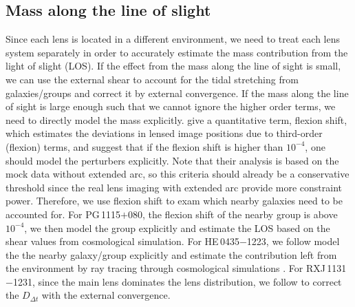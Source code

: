 \documentclass[useAMS,usenatbib]{mnras}
\newcommand\rxj{RXJ\,1131$-$1231}
\newcommand\he{HE\,0435$-$1223}
\newcommand\pg{PG\,1115$+$080}
\newcommand{\Ddt}{{D_{\Delta t}}}
\begin{document}
\subsection{Mass along the line of slight}
\label{sec:LOS}
Since each lens is located in a different environment, we need to treat each lens system separately in order to accurately estimate the mass contribution from the light of slight (LOS). 
If the effect from the mass along the line of sight is small, we can use the external shear to account for the tidal stretching from galaxies/groups and correct it by external convergence. 
If the mass along the line of sight is large enough such that we cannot ignore the higher order terms, we need to directly model the mass explicitly.
\citet{McCullyEtal14,McCullyEtal17} give a quantitative term, flexion shift, which estimates the deviations in lensed image positions due to third-order (flexion) terms, and suggest that if the flexion shift is higher than $10^{-4}$, one should model the perturbers explicitly. 
Note that their analysis is based on the mock data without extended arc, so this criteria should already be a conservative threshold since the real lens imaging with extended arc provide more constraint power. 
Therefore, we use flexion shift to exam which nearby galaxies need to be accounted for. For \pg, the flexion shift of the nearby group is above $10^{-4}$, we then model the group explicitly \citep{WongEtal11,WilsonEtal17,McCullyEtal17} and estimate the LOS based on the shear values from cosmological simulation. For \he, we follow \citet{WongEtal17,SluseEtal17} model the the nearby galaxy/group explicitly and estimate the contribution left from the environment by ray tracing through cosmological simulations \citep{RusuEtal17}. For \rxj, since the main lens dominates the lens distribution, we follow \citet{SuyuEtal13} to correct the $\Ddt$ with the external convergence.
\end{document}
